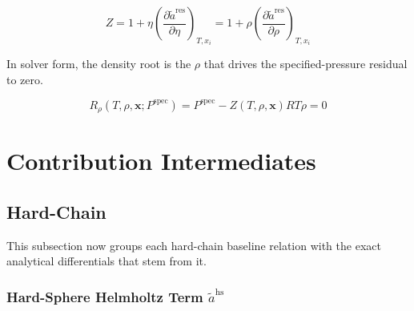 \documentclass[12pt, letterpaper]{article}
\begin{document}

\begin{equation}
    Z
    =
    1+\eta\left(\frac{\partial\tilde{a}^\mathrm{res}}{\partial\eta}\right)_{T,x_{i}}
    =
    1+\rho\left(\frac{\partial\tilde{a}^\mathrm{res}}{\partial\rho}\right)_{T,x_{i}}
    \label{eq:z_from_rho}
\end{equation}

In solver form, the density root is the \(\rho\) that drives the specified-pressure residual to zero.


\begin{equation}
    R_{\rho}\!\left(T,\rho,\mathbf{x};P^{\mathrm{spec}}\right)
    =
    P^{\mathrm{spec}}
    -
    Z(T,\rho,\mathbf{x})RT\rho
    =
    0
    \label{eq:density_solve_residual}
\end{equation}

\section{Contribution Intermediates}
\label{sec:contribution_intermediates}

\subsection{Hard-Chain}
\label{sec:hard_chain}

This subsection now groups each hard-chain baseline relation with the exact analytical differentials that stem from it.

\subsubsection{Hard-Sphere Helmholtz Term \texorpdfstring{\(\tilde{a}^{\mathrm{hs}}\)}{a_hs}}
\end{document}
